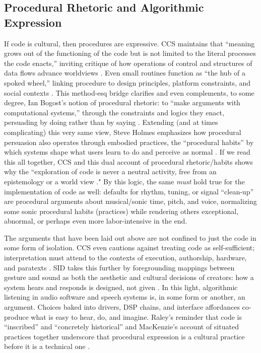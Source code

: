 \subsection{Procedural Rhetoric and Algorithmic Expression}
If code is cultural, then procedures are expressive. CCS maintains that “meaning grows out of the functioning of the code but is not limited to the literal processes the code enacts,” inviting critique of how operations of control and structures of data flows advance worldviews \parencite[p.~39]{Marino_2020}. Even small routines function as “the hub of a spoked wheel,” linking procedure to design principles, platform constraints, and social contexts \parencite[p.~48]{Marino_2020}. This method-esq bridge clarifies and even complements, to some degree, Ian Bogost’s notion of procedural rhetoric: to “make arguments with computational systems,” through the constraints and logics they enact, persuading by doing rather than by saying \parencite[p. 3]{Bogost_2007}. Extending (and at times complicating) this very same view, Steve Holmes emphasizes how procedural persuasion also operates through embodied practices, the “procedural habits” by which systems shape what users learn to do and perceive as normal \parencite[pp.64-67]{Holmes_2017}. If we read this all together, CCS and this dual account of procedural rhetoric/habits shows why the “exploration of code is never a neutral activity, free from an epistemology or a world view \parencite[p. 237]{Holmes_2017}." By this logic, the same \emph{must} hold true for the implementation of code as well: defaults for rhythm, tuning, or signal “clean-up” are procedural arguments about musical/sonic time, pitch, and voice, normalizing some sonic procedural habits (practices) while rendering others exceptional, abnormal, or perhaps even more labor-intensive in the end.

The arguments that have been laid out above are not confined to just the code in some form of isolation. CCS even cautions against treating code as self-sufficient; interpretation must attend to the contexts of execution, authorship, hardware, and paratexts \parencite[pp.~41, 46–48]{Marino_2020}. SID takes this further by foregrounding mappings between gesture and sound as both the aesthetic and cultural decisions of creators: how a system hears and responds is designed, not given \parencite{Franinovic_Serafin_2013}. In this light, algorithmic listening in audio software and speech systems is, in some form or another, an argument. Choices baked into drivers, DSP chains, and interface affordances co-produce what is easy to hear, do, and imagine. Raley’s reminder that code is “inscribed” and “concretely historical” and MacKenzie’s account of situated practices together underscore that procedural expression is a cultural practice before it is a technical one \parencite[as cited in][pp.~41–42]{Marino_2020}. 


